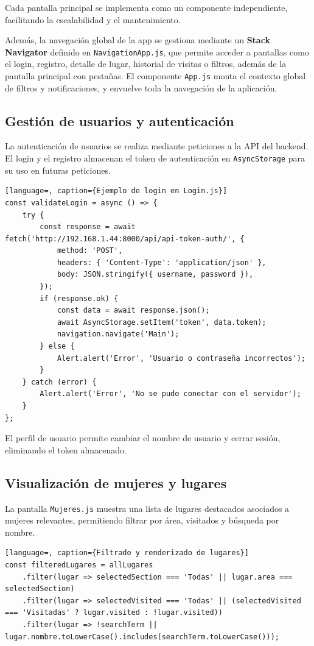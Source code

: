Cada pantalla principal se implementa como un componente independiente, facilitando la escalabilidad y el mantenimiento.

Además, la navegación global de la app se gestiona mediante un \textbf{Stack Navigator} definido en \texttt{NavigationApp.js}, que permite acceder a pantallas como el login, registro, detalle de lugar, historial de visitas o filtros, además de la pantalla principal con pestañas. El componente \texttt{App.js} monta el contexto global de filtros y notificaciones, y envuelve toda la navegación de la aplicación.
\subsection{Gestión de usuarios y autenticación}

La autenticación de usuarios se realiza mediante peticiones a la API del backend. El login y el registro almacenan el token de autenticación en \texttt{AsyncStorage} para su uso en futuras peticiones.

\begin{lstlisting}[language=, caption={Ejemplo de login en Login.js}]
const validateLogin = async () => {
    try {
        const response = await fetch('http://192.168.1.44:8000/api/api-token-auth/', {
            method: 'POST',
            headers: { 'Content-Type': 'application/json' },
            body: JSON.stringify({ username, password }),
        });
        if (response.ok) {
            const data = await response.json();
            await AsyncStorage.setItem('token', data.token);
            navigation.navigate('Main');
        } else {
            Alert.alert('Error', 'Usuario o contraseña incorrectos');
        }
    } catch (error) {
        Alert.alert('Error', 'No se pudo conectar con el servidor');
    }
};
\end{lstlisting}

El perfil de usuario permite cambiar el nombre de usuario y cerrar sesión, eliminando el token almacenado.

\subsection{Visualización de mujeres y lugares}

La pantalla \texttt{Mujeres.js} muestra una lista de lugares destacados asociados a mujeres relevantes, permitiendo filtrar por área, visitados y búsqueda por nombre.

\begin{lstlisting}[language=, caption={Filtrado y renderizado de lugares}]
const filteredLugares = allLugares
    .filter(lugar => selectedSection === 'Todas' || lugar.area === selectedSection)
    .filter(lugar => selectedVisited === 'Todas' || (selectedVisited === 'Visitadas' ? lugar.visited : !lugar.visited))
    .filter(lugar => !searchTerm || lugar.nombre.toLowerCase().includes(searchTerm.toLowerCase()));
\end{lstlisting}


